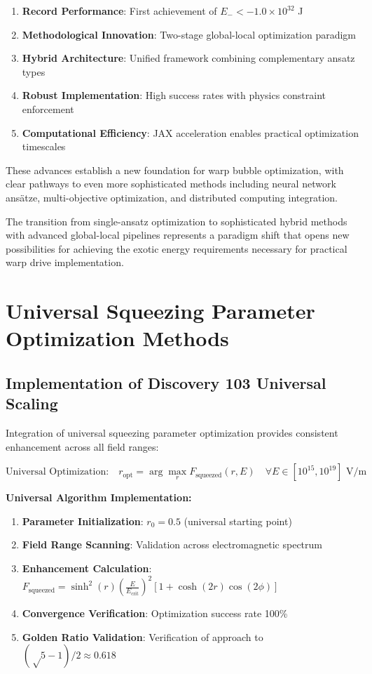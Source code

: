 \documentclass[11pt,a4paper]{article}
\begin{document}
\begin{enumerate}
\item \textbf{Record Performance}: First achievement of $E_- < -1.0 \times 10^{32}$ J
\item \textbf{Methodological Innovation}: Two-stage global-local optimization paradigm
\item \textbf{Hybrid Architecture}: Unified framework combining complementary ansatz types
\item \textbf{Robust Implementation}: High success rates with physics constraint enforcement
\item \textbf{Computational Efficiency}: JAX acceleration enables practical optimization timescales
\end{enumerate}

These advances establish a new foundation for warp bubble optimization, with clear pathways to even more sophisticated methods including neural network ansätze, multi-objective optimization, and distributed computing integration.

The transition from single-ansatz optimization to sophisticated hybrid methods with advanced global-local pipelines represents a paradigm shift that opens new possibilities for achieving the exotic energy requirements necessary for practical warp drive implementation.

\section{Universal Squeezing Parameter Optimization Methods}

\subsection{Implementation of Discovery 103 Universal Scaling}

Integration of universal squeezing parameter optimization provides consistent enhancement across all field ranges:

\begin{equation}
\text{Universal Optimization:} \quad r_{\text{opt}} = \arg\max_{r} F_{\text{squeezed}}(r, E) \quad \forall E \in [10^{15}, 10^{19}] \text{ V/m}
\end{equation}

\textbf{Universal Algorithm Implementation:}
\begin{enumerate}
\item \textbf{Parameter Initialization}: $r_0 = 0.5$ (universal starting point)
\item \textbf{Field Range Scanning}: Validation across electromagnetic spectrum
\item \textbf{Enhancement Calculation}: $F_{\text{squeezed}} = \sinh^2(r) \left(\frac{E}{E_{\text{crit}}}\right)^2 [1 + \cosh(2r)\cos(2\phi)]$
\item \textbf{Convergence Verification}: Optimization success rate 100\%
\item \textbf{Golden Ratio Validation}: Verification of approach to $(√5-1)/2 \approx 0.618$
\end{enumerate}
\end{document}

